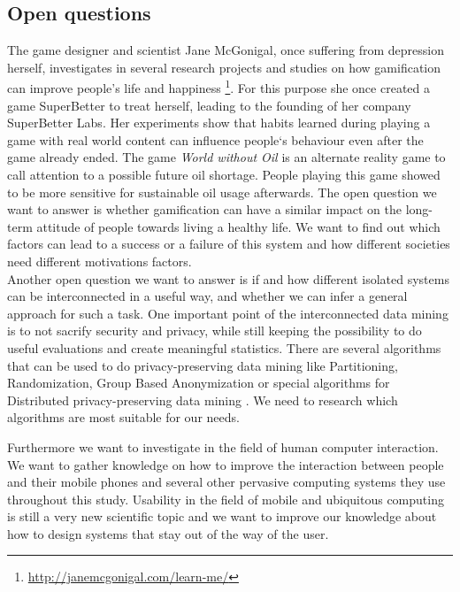 \documentclass[a4paper,11pt]{article}
\begin{document}
\subsection{Open questions}
The game designer and scientist Jane McGonigal, once suffering from depression herself, investigates in several research projects and studies on how gamification can improve people's life and happiness \footnote{\url{http://janemcgonigal.com/learn-me/}}. For this purpose she once created a game SuperBetter to treat herself, leading to the founding of her company SuperBetter Labs. Her experiments show that habits learned during playing a game with real world content can influence people‘s behaviour even after the game already ended. The game \emph{World without Oil} \citep{wwoil2007} is an alternate reality game to call attention to a possible future oil shortage. People playing this game showed to be more sensitive for sustainable oil usage afterwards. The open question we want to answer is whether gamification can have a similar impact on the long-term attitude of people towards living a healthy life. We want to find out which factors can lead to a success or a failure of this system and how different societies need different motivations factors. \\

Another open question we want to answer is if and how different isolated systems can be interconnected in a useful way, and whether we can infer a general approach for such a task. One important point of the interconnected data mining is to not sacrify security and privacy, while still keeping the possibility to do useful evaluations and create meaningful statistics. There are several algorithms that can be used to do privacy-preserving data mining like Partitioning, Randomization, Group Based Anonymization or special algorithms for Distributed privacy-preserving data mining \citep{agrawal2000}. We need to research which algorithms are most suitable for our needs.

Furthermore we want to investigate in the field of human computer interaction. We want to gather knowledge on how to improve the interaction between people and their mobile phones and several other pervasive computing systems they use throughout this study. Usability in the field of mobile and ubiquitous computing is still a very new scientific topic and we want to improve our knowledge about how to design systems that stay out of the way of the user.
\end{document}

